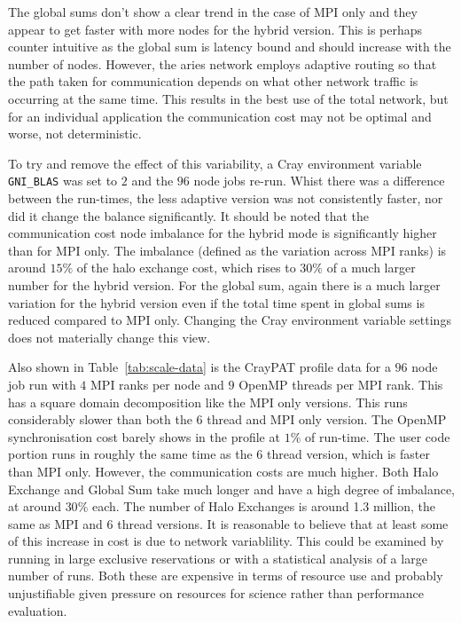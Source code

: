 The global sums don't show a clear trend in the case of MPI only and
they appear to get faster with more nodes for the hybrid version. This
is perhaps counter intuitive as the global sum is latency bound and
should increase with the number of nodes. However, the aries network
employs adaptive routing so that the path taken for communication
depends on what other network traffic is occurring at the same
time. This results in the best use of the total network, but for an
individual application the communication cost may not be optimal and
worse, not deterministic.

To try and remove the effect of this variability, a Cray environment
variable \verb+GNI_BLAS+ was set to $2$ and the $96$ node jobs re-run.
Whist there was a difference between the run-times, the less adaptive
version was not consistently faster, nor did it change the balance
significantly. It should be noted that the communication cost
node imbalance for the hybrid mode is significantly higher than for MPI
only. The imbalance (defined as the variation across MPI ranks) is
around $15\%$ of the halo exchange cost, which rises to $30\%$ of a
much larger number for the hybrid version. For the global sum, again
there is a much larger variation for the hybrid version even if the total time spent in
global sums is reduced compared to MPI only. Changing the Cray
environment variable settings does not materially change this view. 

Also shown in Table~\ref{tab:scale-data} is the CrayPAT profile data
for a $96$ node job run with $4$ MPI ranks per node and $9$ OpenMP
threads per MPI rank. This has a square domain decomposition like the
MPI only versions. This runs considerably slower than both the $6$
thread and MPI only version. The OpenMP synchronisation cost barely
shows in the profile at $1\%$ of run-time. The user code portion runs
in roughly the same time as the $6$ thread version, which is faster
than MPI only. However, the communication costs are much higher. Both
Halo Exchange and Global Sum take much longer and have a high degree
of imbalance, at around $30\%$ each. The number of Halo Exchanges is
around 1.3 million, the same as MPI and $6$ thread versions.  It is
reasonable to believe that at least some of this increase in cost is
due to network variablility. This could be examined by running in
large exclusive reservations or with a statistical analysis of a large
number of runs. Both these are expensive in terms of resource use and
probably unjustifiable given pressure on resources for science rather
than performance evaluation.

